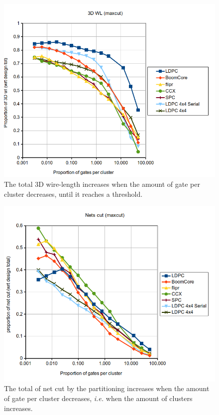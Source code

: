 \documentclass[conference]{IEEEtran}
\begin{document}
\begin{figure}[!t]
\centering
\includegraphics[width=\linewidth]{prop-3Dwl-wrt-design_prop-gate-per-clusters_maxcutv3.png}
\caption{The total 3D wire-length increases when the amount of gate per cluster decreases, until it reaches a threshold.}
\label{fig:3Dwl}
\end{figure}

\begin{figure}[!t]
\centering
\includegraphics[width=\linewidth]{prop-netcut-wrt-design_prop-gate-per-clusters_maxcutv2.png}
\caption{The total of net cut by the partitioning increases when the amount of gate per cluster decreases, \textit{i.e.} when the amount of clusters increases.}
\label{fig:3Dnets}
\end{figure}
\end{document}
